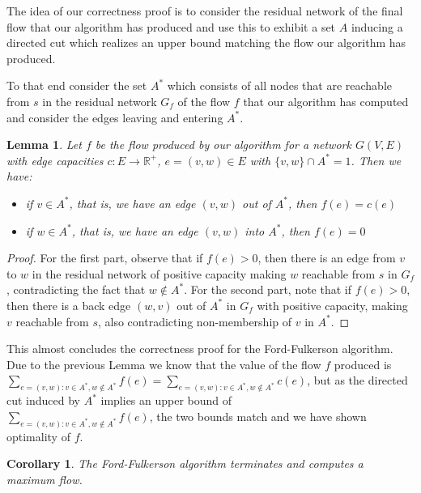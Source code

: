 \documentclass{article}
\newtheorem{lemma}{Lemma}
\newtheorem{corollary}{Corollary}
\begin{document}
The idea of our correctness proof is to consider the residual network of the final flow that our algorithm has produced and use this to exhibit a set $A$ inducing a directed cut which realizes an upper bound matching the flow our algorithm has produced.

To that end consider the set $A^*$ which consists of all nodes that are reachable from $s$ in the residual network $G_f$ of the flow $f$ that our algorithm has computed and consider the edges leaving and entering $A^*$.
\begin{lemma}
Let $f$ be the flow produced by our algorithm for a network $G(V,E)$ with edge capacities $c:E\rightarrow \mathbb{R}^+$, $e=(v,w)\in E$ with $\{v,w\}\cap A^*=1$. Then we have:
\begin{itemize}
\item if $v\in A^*$, that is, we have an edge $(v,w)$ out of  $A^*$, then $f(e)=c(e)$
\item if $w\in A^*$, that is, we have an edge $(v,w)$ into $A^*$, then $f(e)=0$ 
\end{itemize}
\end{lemma}
\begin{proof}
For the first part, observe that if $f(e)>0$, then there is an edge from $v$ to $w$ in the residual network of positive capacity making $w$ reachable from $s$ in $G_f$, contradicting the fact that $w\notin A^*$.
For the second part, note that if $f(e)>0$, then there is a back edge $(w,v)$ out of $A^*$ in $G_f$ with positive capacity, making $v$ reachable from $s$, also contradicting non-membership of $v$ in $A^*$.
\end{proof}

This almost concludes the correctness proof for the Ford-Fulkerson algorithm. Due to the previous Lemma we know that the value of the flow $f$ produced is $\displaystyle \sum_{e=(v,w): v\in A^*, w\notin A^*} f(e)=\sum_{e=(v,w): v\in A^*, w\notin A^*} c(e)$, but as the directed cut induced by $A^*$ implies an upper bound of\\ $\displaystyle\sum_{e=(v,w): v\in A^*, w\notin A^*} f(e)$, the two bounds match and we have shown optimality of $f$.

\begin{corollary}
The Ford-Fulkerson algorithm terminates and computes a maximum flow.
\end{corollary}
\end{document}
